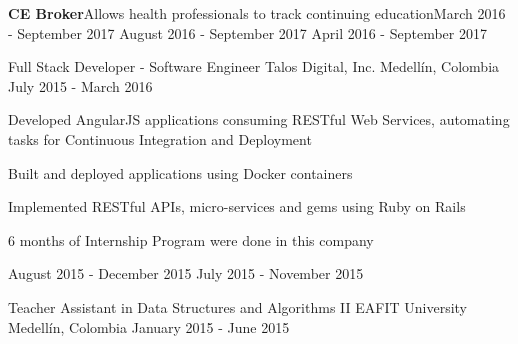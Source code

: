 \begin{cventries}
{\begin{cvsubentries}
{                     {\textbf{CE Broker}}{\dotsep}Allows health professionals to track continuing
                     education{\dotsep}}{March 2016 - September 2017}{}
                      {August 2016 - September 2017}{}
                      {April 2016 - September 2017}{}
      \end{cvsubentries}
    }
  \cventry
    {Full Stack Developer - Software Engineer}
    {Talos Digital, Inc.}
    {Medellín, Colombia}
    {July 2015 - March 2016}
    {
      \begin{cvitems}
        \item {Developed AngularJS applications consuming RESTful Web Services, automating tasks
               for Continuous Integration and Deployment}
        \item {Built and deployed applications using Docker containers}
        \item {Implemented RESTful APIs, micro-services and gems using Ruby on Rails}
        \item {6 months of Internship Program were done in this company}
      \end{cvitems}
      \begin{cvsubentries}
                      {August 2015 - December 2015}{}
                      {July 2015 - November 2015}{}
      \end{cvsubentries}
    }
  \cventry
    {Teacher Assistant in Data Structures and Algorithms II}
    {EAFIT University}
    {Medellín, Colombia}
    {January 2015 - June 2015}
    {
      \begin{cvitems}

\end{cvitems}}
\end{cventries}
